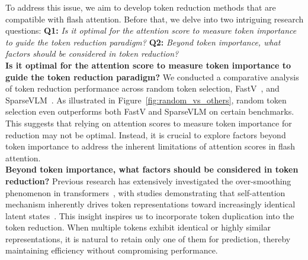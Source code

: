 To address this issue, we aim to develop token reduction methods that are compatible with flash attention.
Before that, we delve into two intriguing research questions:
\textbf{Q1:} \textit{Is it optimal for the attention score to measure token importance to guide the token reduction paradigm?}
\textbf{Q2:} \textit{Beyond token importance, what factors should be considered in token reduction?}
 \\
\textbf{Is it optimal for the attention score to measure token importance to guide the token reduction paradigm?}
We conducted a comparative analysis of token reduction performance across random token selection, FastV~\citep{chen2024image}, and SparseVLM~\citep{zhang2024sparsevlm}. As illustrated in Figure~\ref{fig:random_vs_others}, random token selection even outperforms both FastV and SparseVLM on certain benchmarks. This suggests that relying on attention scores to measure token importance for reduction may not be optimal. Instead, it is crucial to explore factors beyond token importance to address the inherent limitations of attention scores in flash attention.
\\
\textbf{Beyond token importance, what factors should be considered in token reduction?}
Previous research has extensively investigated the over-smoothing phenomenon in transformers~\citep{ nguyen2023mitigating, wang2022anti}, with studies demonstrating that self-attention mechanism inherently drives token representations toward increasingly identical latent states~\citep{gong2021vision, wang2023label}.
This insight inspires us to incorporate token duplication into the token reduction. When multiple tokens exhibit identical or highly similar representations, it is natural to retain only one of them for prediction, thereby maintaining efficiency without compromising performance.
% 



